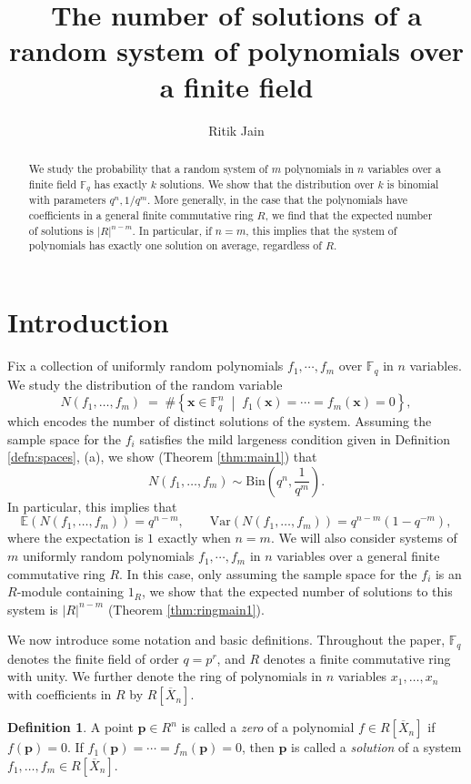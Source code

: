 \documentclass[12pt]{amsart}
\title{The number of solutions of a random system of polynomials over a finite field}
\author{Ritik Jain}
\theoremstyle{definition}
\newtheorem{definition}[theorem]{Definition}
\newcommand{\EE}{\mathbb{E} }
\newcommand{\FF}{\mathbb{F} }
\begin{document}
\begin{abstract}
We study the probability that a random system of $m$ polynomials in $n$ variables over a finite field $\FF_q$ has exactly $k$ solutions. We show that the distribution over $k$ is binomial with parameters $q^n, 1/q^m$. More generally, in the case that the polynomials have coefficients in a general finite commutative ring $R$, we find that the expected number of solutions is $|R|^{n-m}$. In particular, if $n=m$, this implies that the system of polynomials has exactly one solution on average, regardless of $R$.
\end{abstract}
\maketitle

\section{Introduction}
Fix a collection of uniformly random polynomials $f_1, \cdots, f_m$ over $\FF_q$ in $n$ variables. We study the distribution of the random variable
\[
N(f_1,\dots,f_m)
\;=\;
\#\left\{\mathbf{x}\in \FF_q^n \;\middle|\; f_1(\mathbf{x})=\cdots=f_m(\mathbf{x})=0 \right\},
\]
which encodes the number of distinct solutions of the system. Assuming the sample space for the $f_i$ satisfies the mild largeness condition given in Definition \ref{defn:spaces}, (a), we show (Theorem \ref{thm:main1}) that
\[
N(f_1,\dots,f_m) \sim \mathrm{Bin}\left( q^n, \frac{1}{q^m} \right).
\]
In particular, this implies that
\[
\EE(N(f_1,\dots,f_m)) = q^{n-m}, \qquad \mathrm{Var}(N(f_1,\dots,f_m))= q^{n-m}(1-q^{-m}),
\]
where the expectation is $1$ exactly when $n = m$.
We will also consider systems of $m$ uniformly random polynomials $f_1, \cdots , f_m$ in $n$ variables over a general finite commutative ring $R$. In this case, only assuming the sample space for the $f_i$ is an $R$-module containing $1_R$, we show that the expected number of solutions to this system is $|R|^{n-m}$ (Theorem \ref{thm:ringmain1}).

We now introduce some notation and basic definitions. Throughout the paper, $\FF_q$ denotes the finite field of order $q=p^r$, and $R$ denotes a finite commutative ring with unity. We further denote the ring of polynomials in $n$ variables $x_1,\dots,x_n$ with coefficients in $R$ by $R[\overline{X}_n]$.

\begin{definition}
A point $\mathbf{p}\in R^n$ is called a \emph{zero} of a polynomial $f\in R[\overline{X}_n]$ if $f(\mathbf{p})=0$. If $f_1(\mathbf{p})=\cdots=f_m(\mathbf{p})=0$, then $\mathbf{p}$ is called a \emph{solution} of a system $f_1,\dots,f_m \in R[\overline{X}_n]$.
\end{definition}
\end{document}

